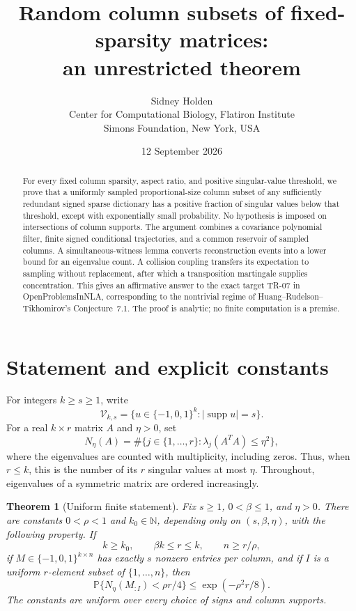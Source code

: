 \documentclass[11pt,a4paper]{article}
\title{Random column subsets of fixed-sparsity matrices:\\an unrestricted theorem}
\author{Sidney Holden\\\small Center for Computational Biology, Flatiron Institute\\\small Simons Foundation, New York, USA}
\date{12 September 2026}
\newtheorem{theorem}{Theorem}[section]
\theoremstyle{remark}\newtheorem{remark}[theorem]{Remark}
\newcommand{\Prob}{\mathbb P}
\newcommand{\supp}{\operatorname{supp}}
\begin{document}
\maketitle
\begin{abstract}
For every fixed column sparsity, aspect ratio, and positive singular-value threshold, we prove that a uniformly sampled proportional-size column subset of any sufficiently redundant signed sparse dictionary has a positive fraction of singular values below that threshold, except with exponentially small probability. No hypothesis is imposed on intersections of column supports. The argument combines a covariance polynomial filter, finite signed conditional trajectories, and a common reservoir of sampled columns. A simultaneous-witness lemma converts reconstruction events into a lower bound for an eigenvalue count. A collision coupling transfers its expectation to sampling without replacement, after which a transposition martingale supplies concentration. This gives an affirmative answer to the exact target TR-07 in OpenProblemsInNLA, corresponding to the nontrivial regime of Huang--Rudelson--Tikhomirov's Conjecture~7.1. The proof is analytic; no finite computation is a premise.
\end{abstract}

\section{Statement and explicit constants}
For integers $k\ge s\ge1$, write
\[
 \mathcal V_{k,s}=\{u\in\{-1,0,1\}^k:|\supp u|=s\}.
\]
For a real $k\times r$ matrix $A$ and $\eta>0$, set
\[
 N_\eta(A)=\#\{j\in\{1,\ldots,r\}:\lambda_j(A^TA)\le\eta^2\},
\]
where the eigenvalues are counted with multiplicity, including zeros. Thus, when $r\le k$, this is the number of its $r$ singular values at most $\eta$. Throughout, eigenvalues of a symmetric matrix are ordered increasingly.

\begin{theorem}[Uniform finite statement]\label{thm:finite}
Fix $s\ge1$, $0<\beta\le1$, and $\eta>0$. There are constants $0<\rho<1$ and $k_0\in\mathbb N$, depending only on $(s,\beta,\eta)$, with the following property. If
\[
 k\ge k_0,\qquad \beta k\le r\le k,\qquad n\ge r/\rho,
\]
if $M\in\{-1,0,1\}^{k\times n}$ has exactly $s$ nonzero entries per column, and if $I$ is a uniform $r$-element subset of $\{1,\ldots,n\}$, then
\begin{equation}\label{eq:main}
 \Prob\{N_\eta(M_{:I})<\rho r/4\}
 \le \exp(-\rho^2r/8).
\end{equation}
The constants are uniform over every choice of signs and column supports.
\end{theorem}
\end{document}
